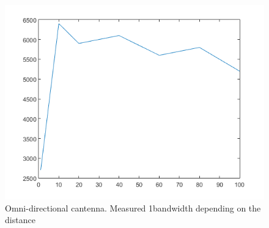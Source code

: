 \documentclass[12pt,a4paper]{article}
\newcommand{\figurewidth}[0]{.65\textwidth}
\begin{document}
\begin{figure}
\begin{center}
	\includegraphics[width=\figurewidth]{plots/omni_b.png}
	\caption{Omni-directional cantenna. Measured 1bandwidth depending on the distance}
	\label{img:dist:band:omni}
\end{center}\end{figure}
\end{document}
